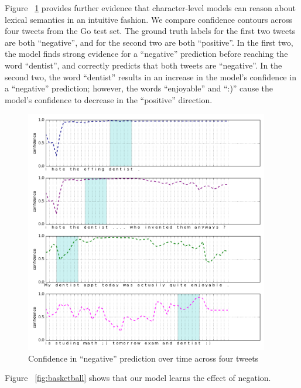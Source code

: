 \documentclass{article} %
\begin{document}
Figure ~\ref{fig:dentist} provides further evidence that character-level models can reason about lexical semantics in an intuitive fashion. We compare confidence contours across four tweets from the Go test set. The ground truth labels for the first two tweets are both ``negative'', and for the second two are both ``positive''. In the first two, the model finds strong evidence for a ``negative'' prediction before reaching the word ``dentist'', and correctly predicts that both tweets are ``negative''. In the second two, the word ``dentist'' results in an increase in the model's confidence in a ``negative'' prediction; however, the words ``enjoyable'' and ``:)'' cause the model's confidence to decrease in the ``positive'' direction. 

\begin{figure}[h!]
\begin{center}
\includegraphics[width=0.95\textwidth]{figs/dentist}
\end{center}
\caption{Confidence in ``negative'' prediction over time across four tweets}
\label{fig:dentist}
\end{figure}

Figure ~\ref{fig:basketball} shows that our model learns the effect of negation.
\end{document}
